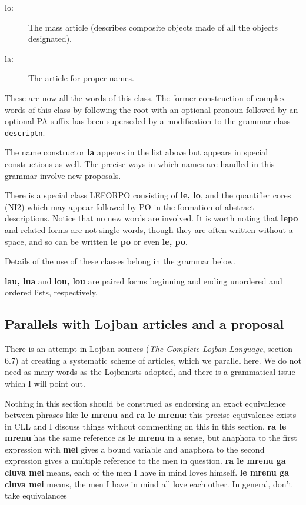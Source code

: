 \documentclass[12pt]{book}
\begin{document}
{\begin{description}
\item[lo:]  The mass article (describes composite objects made of all the objects designated).

\item[la:]   The article for proper names.
\end{description}


These are now all the words of this class.  The former construction of complex words of this class
by following the root with an optional pronoun followed by an optional PA suffix has been superseded by a modification to the grammar class {\tt descriptn}.

The name constructor {\bf la} appears in the list above but appears in special constructions as well.   The precise ways in which names are handled in this grammar involve new proposals.

There is a special class LEFORPO consisting of {\bf le, lo}, and the quantifier cores (NI2) which may appear
followed by PO in the formation of abstract descriptions.   Notice that no new words are involved.  It is worth noting that {\bf lepo} and related forms are
not single words, though they are often written without a space, and so can be written {\bf le po} or even {\bf le, po}.

Details of the use of these classes belong in the grammar below.

{\bf lau, lua} and {\bf lou, lou} are paired forms beginning and ending unordered and ordered lists, respectively. 

\subsection{Parallels with Lojban articles and a proposal}

There is an attempt in Lojban sources ({\em The Complete Lojban Language\/}, section 6.7)  at creating a systematic scheme of articles, which we parallel here.  We do not need as many words as the Lojbanists adopted, and there is a grammatical issue which I will point out.

Nothing in this section should be construed as endorsing an exact equivalence between phrases like {\bf le mrenu} and {\bf ra le mrenu}:  this precise equivalence exists in CLL and I discuss things without commenting on this in this section.  {\bf ra le mrenu} has the same reference as {\bf le mrenu} in a sense, but anaphora to the first expression with {\bf mei} gives a bound variable and anaphora to the second expression gives a multiple reference to the men in question.  {\bf ra le mrenu ga cluva mei} means, each of the men I have in mind loves himself.  {\bf le mrenu ga cluva mei} means, the men I have in mind all love each other.  In general, don't take equivalances

}
\end{document}
